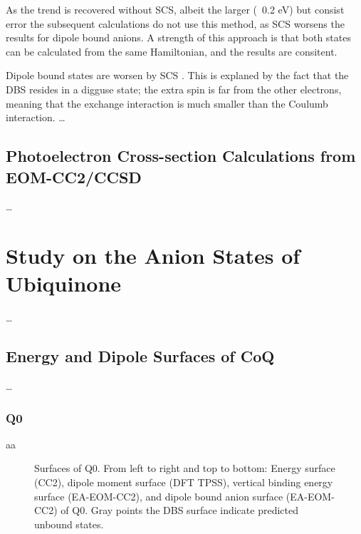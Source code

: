As the trend is recovered without SCS, albeit the larger (~0.2 eV) but consist error the subsequent calculations do not use this method, as SCS worsens the results for dipole bound anions. A strength of this approach is that both states can be calculated from the same Hamiltonian, and the results are consitent.

Dipole bound states are worsen by SCS \cite{paran2024performance}. This is explaned by the fact that the DBS resides in a digguse state; the extra spin is far from the other electrons, meaning that the exchange interaction is much smaller than the Coulumb interaction.
\ldots
\subsection{Photoelectron Cross-section Calculations from EOM-CC2/CCSD}

\ldots
\section{Study on the Anion States of Ubiquinone}

\ldots
\subsection{Energy and Dipole Surfaces of CoQ}

\ldots
\subsubsection{Q0}
aa
\begin{figure}[ht!]
  \centering
  \small
  
  \label{fig:Q0_maps}
  \caption[Surfaces of Q0]{Surfaces of Q0. From left to right and top to bottom: Energy surface (CC2), dipole moment surface (DFT TPSS), vertical binding energy surface (EA-EOM-CC2), and dipole bound anion surface (EA-EOM-CC2) of Q0. Gray points the DBS surface indicate predicted unbound states.}
\end{figure}
\iffalse \begin{figure}[ht!]
  \centering
  \begin{minipage}[]{0.49\textwidth}
    \centering
    \small
    
  \end{minipage}%
  \begin{minipage}[]{0.47\textwidth}
    \centering
    \small
    
  \end{minipage}
  \begin{minipage}[]{0.49\textwidth}
    \centering
    \small
    
  \end{minipage}%
  \begin{minipage}[]{0.47\textwidth}
    \centering
    \small
    
  \end{minipage}
  \label{fig:Q0_surf}
  \caption[Surfaces of Q0]{Surfaces of Q0. Left: Energy surface. Right: Dipole moment surface.}
\end{figure} \fi

